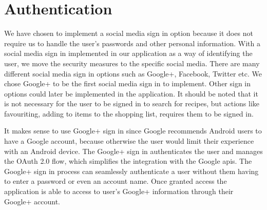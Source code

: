 \section{Authentication}
We have chosen to implement a social media sign in option because it does not require us to handle the user's passwords and other personal information. With a social media sign in implemented in our application as a way of identifying the user, we move the security measures to the specific social media.
There are many different social media sign in options such as Google+, Facebook, Twitter etc. We chose Google+ to be the first social media sign in to implement. Other sign in options could later be implemented in the application. It should be noted that it is not necessary for the user to be signed in to search for recipes, but actions like favouriting, adding to items to the shopping list, requires them to be signed in.

It makes sense to use Google+ sign in since Google recommends Android users to have a Google account, because otherwise the user would limit their experience with an Android device. 
The Google+ sign in authenticates the user and manages the OAuth 2.0 flow, which simplifies the integration with the Google \ac{api}s.
The Google+ sign in process can seamlessly authenticate a user without them having to enter a password or even an account name. 
Once granted access the application is able to access to user's Google+ information through their Google+ account.\cite{googleplusvideo}

